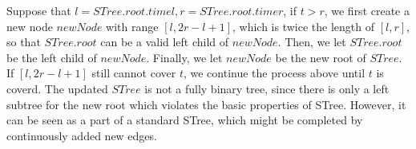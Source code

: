 \documentclass[10pt,journal,compsoc]{IEEEtran}
\begin{document}
Suppose that $ l=STree.root.timel,r=STree.root.timer $, if $ t>r $, we first create a new node $ newNode $ with range $ [l,2r-l+1] $, which is twice the length of $ [l,r] $, so that $ STree.root $ can be a valid left child of $ newNode $. Then, we let $ STree.root $ be the left child of $ newNode $. Finally, we let $ newNode $ be the new root of $ STree $. If $ [l,2r-l+1] $ still cannot cover $ t $, we continue the process above until $ t $ is coverd. The updated $ STree $ is not a fully binary tree, since there is only a left subtree for the new root which violates the basic properties of STree. However, it can be seen as a part of a standard STree, which might be completed by continuously added new edges.

\end{document}
